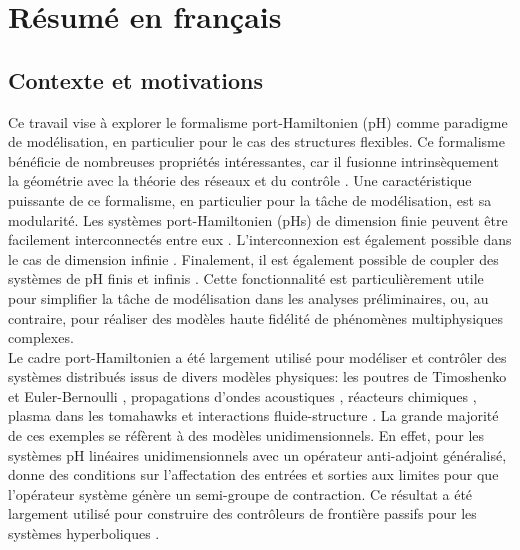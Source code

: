 
\chapter*{R\'esum\'e en fran\c{c}ais}

\minitoc

\section{Contexte et motivations}

Ce travail vise à explorer le formalisme port-Hamiltonien (pH) comme paradigme de modélisation, en particulier pour le cas des structures flexibles. Ce formalisme bénéficie de nombreuses propriétés intéressantes, car il fusionne intrinsèquement la géométrie avec la théorie des réseaux et du contrôle \cite{vanderschaft2006book}. Une caractéristique puissante de ce formalisme, en particulier pour la tâche de modélisation, est sa modularité. Les systèmes port-Hamiltonien (pHs) de dimension finie peuvent être facilement interconnectés entre eux \cite{cervera2007interconnection}. L'interconnexion est également possible dans le cas de dimension infinie \cite{kurula2010,augner2020int}. Finalement, il est également possible de coupler des systèmes de pH finis et infinis \cite{pasumarthy2006}. Cette fonctionnalité est particulièrement utile pour simplifier la tâche de modélisation dans les analyses préliminaires, ou, au contraire, pour réaliser des modèles haute fidélité de phénomènes multiphysiques complexes. \\

Le cadre port-Hamiltonien a été largement utilisé pour modéliser et contrôler des systèmes distribués issus de divers modèles physiques: les poutres de Timoshenko \cite{macchelli2004timo} et Euler-Bernoulli \cite{aoues2017modeling}, propagations d'ondes acoustiques \cite{trenchant2018}, réacteurs chimiques \cite{ramirez2013irreversible}, plasma dans les tomahawks \cite{vu2016plasma} et interactions fluide-structure \cite{cardoso2017}. La grande majorité de ces exemples se réfèrent à des modèles unidimensionnels. En effet, pour les systèmes pH linéaires unidimensionnels avec un opérateur anti-adjoint généralisé, \cite{legorrec2005} donne des conditions sur l'affectation des entrées et sorties aux limites pour que l'opérateur système génère un semi-groupe de contraction. Ce résultat a été largement utilisé pour construire des contrôleurs de frontière passifs pour les systèmes hyperboliques \cite{villegas2009exponential,macchelli2016synthesis,macchelli2020exponential}. \\

